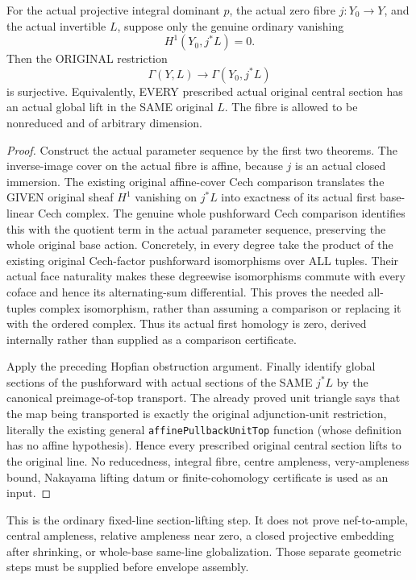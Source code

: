 \begin{theorem}
\label{thm:projective-central-fibre-original-section-surjective}
\leanok
For the actual projective integral dominant $p$, the actual zero fibre
$j:Y_0\to Y$, and the actual invertible $L$, suppose only the genuine
ordinary vanishing
\[
 H^1(Y_0,j^*L)=0.
\]
Then the ORIGINAL restriction
\[
 \Gamma(Y,L)\longrightarrow\Gamma(Y_0,j^*L)
\]
is surjective. Equivalently, EVERY prescribed actual original central
section has an actual global lift in the SAME original $L$.
The fibre is allowed to be nonreduced and of arbitrary dimension.
\end{theorem}
\begin{proof}
Construct the actual parameter sequence by the first two theorems.
The inverse-image cover on the actual fibre is affine, because $j$ is
an actual closed immersion. The existing original affine-cover Cech
comparison translates the GIVEN original sheaf $H^1$ vanishing on
$j^*L$ into exactness of its actual first base-linear Cech complex.
The genuine whole pushforward Cech comparison identifies this with
the quotient term in the actual parameter sequence, preserving the
whole original base action. Concretely, in every degree take the product
of the existing original Cech-factor pushforward isomorphisms over ALL
tuples. Their actual face naturality makes these degreewise isomorphisms
commute with every coface and hence its alternating-sum differential.
This proves the needed all-tuples complex isomorphism, rather than
assuming a comparison or replacing it with the ordered complex.
Thus its actual first homology is zero,
derived internally rather than supplied as a comparison certificate.

Apply the preceding Hopfian obstruction argument. Finally identify
global sections of the pushforward with actual sections of the SAME
$j^*L$ by the canonical preimage-of-top transport. The already proved
unit triangle says that the map being transported is exactly the
original adjunction-unit restriction, literally the existing general
\texttt{affinePullbackUnitTop} function (whose definition has no affine
hypothesis). Hence every prescribed original
central section lifts to the original line. No reducedness, integral
fibre, centre ampleness, very-ampleness bound, Nakayama lifting datum
or finite-cohomology certificate is used as an input.
\end{proof}

This is the ordinary fixed-line section-lifting step. It does not prove
nef-to-ample, central ampleness, relative ampleness near zero, a closed
projective embedding after shrinking, or whole-base same-line globalization.
Those separate geometric steps must be supplied before envelope assembly.
